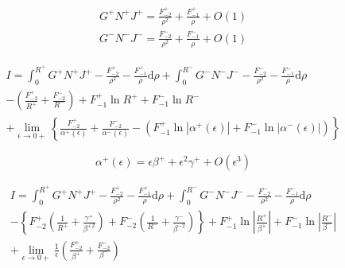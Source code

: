\documentclass[a4paper,11pt]{article}
\newcommand{\td}{\mathrm{d}}
\begin{document}
\begin{align}
G^+ N^+ J^+ = \frac{F_{-2}^+}{\rho^2} + \frac{F_{-1}^+}{\rho} + O(1) \nonumber \\
G^- N^- J^- = \frac{F_{-2}^-}{\rho^2} + \frac{F_{-1}^-}{\rho} + O(1)
\end{align}

\begin{multline}
I =
\int_{0}^{R^+} G^+ N^+ J^+ - \frac{F_{-2}^+}{\rho^2} - \frac{F_{-1}^+}{\rho} \td \rho +
\int_{0}^{R^-} G^- N^- J^- - \frac{F_{-2}^-}{\rho^2} - \frac{F_{-1}^-}{\rho} \td \rho \\
-
\left(
\frac{F_{-2}^+}{R^+}
+ \frac{F_{-2}^-}{R^-} 
\right)
+ F_{-1}^+ \ln R^+
+ F_{-1}^- \ln R^- \\
+
\lim_{\epsilon \to 0+}
\left\{
\frac{F_{-2}^+}{\alpha^+(\epsilon)}
+ \frac{F_{-2}^-}{\alpha^-(\epsilon)}
- \left(F_{-1}^+ \ln \left|\alpha^+(\epsilon) \right|
+ F_{-1}^- \ln \left|\alpha^-(\epsilon) \right|\right)
\right\}
\end{multline}

\begin{equation}
\alpha^+(\epsilon) =  \epsilon \beta^+ + \epsilon^2 \gamma^+ + O(\epsilon^3)
\end{equation}

\begin{multline}
I =
\int_{0}^{R^+} G^+ N^+ J^+ - \frac{F_{-2}^+}{\rho^2} - \frac{F_{-1}^+}{\rho} \td \rho +
\int_{0}^{R^-} G^- N^- J^- - \frac{F_{-2}^-}{\rho^2} - \frac{F_{-1}^-}{\rho} \td \rho \\
-
\left\{
F_{-2}^+\left(\frac{1}{R^+} + \frac{\gamma^+}{\beta^{+2}}\right)
+
F_{-2}^-\left(\frac{1}{R^-} + \frac{\gamma^-}{\beta^{-2}}\right)
\right\}
+ F_{-1}^+ \ln \left|\frac{R^+}{\beta^+}\right|
+ F_{-1}^- \ln \left|\frac{R^-}{\beta^-}\right| \\
+
\lim_{\epsilon \to 0+}
\frac{1}{\epsilon}
\left(
\frac{F_{-2}^+}{\beta^+}
+ \frac{F_{-2}^-}{\beta^-}
\right)
\end{multline}
\end{document}
